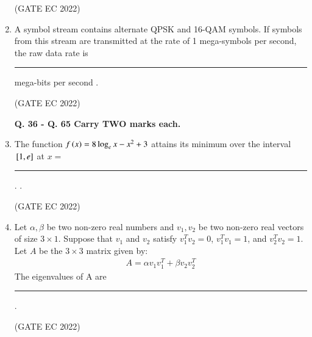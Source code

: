 \documentclass[journal,12pt,onecolumn]{IEEEtran}
\theoremstyle{remark}
\begin{document}
\begin{enumerate}
    \hfill{(GATE EC 2022)}

    \item A symbol stream contains alternate QPSK and 16-QAM symbols. If symbols from this stream are transmitted at the rate of 1 mega-symbols per second, the raw  data rate is \rule{2cm}{0.4pt} mega-bits per second .
    
    \hfill{(GATE EC 2022)}

\textbf{Q. 36 - Q. 65  Carry TWO marks each.}

    \item The function $f\left(x\right) = 8\log_e x - x^2 + 3$ attains its minimum over the interval ${}\left[1, e\right]$ at $x = $ \rule{2cm}{0.4pt}. .
    
    \hfill{(GATE EC 2022)}
    \begin{enumerate}
    \end{enumerate}

    \item Let $\alpha, \beta$ be two non-zero real numbers and $v_1, v_2$ be two non-zero real vectors of size $3 \times 1$. Suppose that $v_1$ and $v_2$ satisfy $v_1^T v_2 = 0$, $v_1^T v_1 = 1$, and $v_2^T v_2 = 1$. Let $A$ be the $3 \times 3$ matrix given by:
    \begin{align}
     A = \alpha v_1 v_1^T + \beta v_2 v_2^T 
     \end{align}
    The eigenvalues of A are \rule{2cm}{0.4pt}.
    
    \hfill{(GATE EC 2022)}
    \begin{enumerate}
    \end{enumerate}


\end{enumerate}
\end{document}
